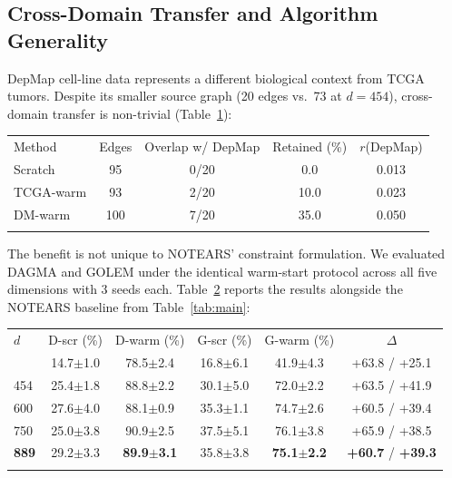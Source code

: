 \documentclass{ws-jbcb}
\begin{document}
\subsection{Cross-Domain Transfer and Algorithm Generality}

DepMap cell-line data represents a different biological context from TCGA tumors. Despite its smaller source graph (20 edges vs.\ 73 at $d = 454$), cross-domain transfer is non-trivial (Table~\ref{tab:cross}):

\begin{table}[t]
{\begin{tabular}{@{}lcccc@{}} \toprule
Method & Edges & Overlap w/ DepMap & Retained (\%) & $r$(DepMap)\\\colrule
Scratch & 95 & 0/20 & 0.0 & 0.013\\
TCGA-warm & 93 & 2/20 & 10.0 & 0.023\\
DM-warm & 100 & 7/20 & 35.0 & 0.050\\
\botrule
\end{tabular}}
\label{tab:cross}
\end{table}

The benefit is not unique to NOTEARS' constraint formulation. We evaluated DAGMA and GOLEM under the identical warm-start protocol across all five dimensions with 3 seeds each. Table~\ref{tab:multialgo} reports the results alongside the NOTEARS baseline from Table~\ref{tab:main}:

\begin{table}[b]
{\begin{tabular}{@{}lccccc@{}} \toprule
$d$ & D-scr (\%) & D-warm (\%) & G-scr (\%) & G-warm (\%) & $\Delta$\\\colrule
200 & 14.7$\pm$1.0 & 78.5$\pm$2.4 & 16.8$\pm$6.1 & 41.9$\pm$4.3 & +63.8 / +25.1\\
454 & 25.4$\pm$1.8 & 88.8$\pm$2.2 & 30.1$\pm$5.0 & 72.0$\pm$2.2 & +63.5 / +41.9\\
600 & 27.6$\pm$4.0 & 88.1$\pm$0.9 & 35.3$\pm$1.1 & 74.7$\pm$2.6 & +60.5 / +39.4\\
750 & 25.0$\pm$3.8 & 90.9$\pm$2.5 & 37.5$\pm$5.1 & 76.1$\pm$3.8 & +65.9 / +38.5\\
\textbf{889} & 29.2$\pm$3.3 & \textbf{89.9$\pm$3.1} & 35.8$\pm$3.8 & \textbf{75.1$\pm$2.2} & \textbf{+60.7} / \textbf{+39.3}\\
\botrule
\end{tabular}}
\label{tab:multialgo}
\end{table}
\end{document}
